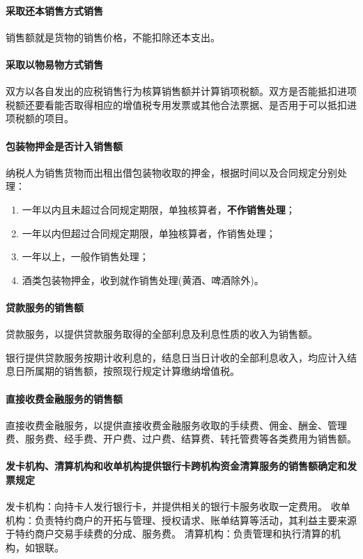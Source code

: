 \documentclass[UTF8,12pt]{ctexart}
\numberwithin{equation}{section} %
\numberwithin{figure}{section}
\numberwithin{table}{section}
\begin{document}
	\paragraph{采取还本销售方式销售}
	销售额就是货物的销售价格，不能扣除还本支出。
	
	\paragraph{采取以物易物方式销售}
	双方以各自发出的应税销售行为核算销售额并计算销项税额。双方是否能抵扣进项税额还要看能否取得相应的增值税专用发票或其他合法票据、是否用于可以抵扣进项税额的项目。
	
	\paragraph{包装物押金是否计入销售额}
	纳税人为销售货物而出租出借包装物收取的押金，根据时间以及合同规定分别处理：
	\begin{enumerate}
		\item 一年以内且未超过合同规定期限，单独核算者，\textbf{不作销售处理}；
		
		\item 一年以内但超过合同规定期限，单独核算者，作销售处理；
		
		\item 一年以上，一般作销售处理；
		
		\item 酒类包装物押金，收到就作销售处理(黄酒、啤酒除外)。
	\end{enumerate}
	
	\paragraph{贷款服务的销售额}
	贷款服务，以提供贷款服务取得的全部利息及利息性质的收入为销售额。
	
	银行提供贷款服务按期计收利息的，结息日当日计收的全部利息收入，均应计入结息日所属期的销售额，按照现行规定计算缴纳增值税。
	
	\paragraph{直接收费金融服务的销售额}
	直接收费金融服务，以提供直接收费金融服务收取的手续费、佣金、酬金、管理费、服务费、经手费、开户费、过户费、结算费、转托管费等各类费用为销售额。
	
	\paragraph{发卡机构、清算机构和收单机构提供银行卡跨机构资金清算服务的销售额确定和发票规定}
	发卡机构：向持卡人发行银行卡，并提供相关的银行卡服务收取一定费用。
	收单机构：负责特约商户的开拓与管理、授权请求、账单结算等活动，其利益主要来源于特约商户交易手续费的分成、服务费。
	清算机构：负责管理和执行清算的机构，如银联。
	
\end{document}
